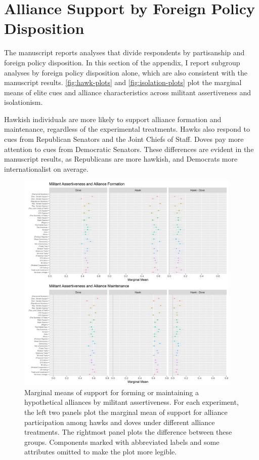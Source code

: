 \documentclass[12pt]{article}
\begin{document}
\newpage


\section{Alliance Support by Foreign Policy Disposition} 


The manuscript reports analyses that divide respondents by partisanship and foreign policy disposition. 
In this section of the appendix, I report subgroup analyses by foreign policy disposition alone, which are also consistent with the manuscript results.
\autoref{fig:hawk-plots} and \autoref{fig:isolation-plots} plot the marginal means of elite cues and alliance characteristics across militant assertiveness and isolationism. 


Hawkish individuals are more likely to support alliance formation and maintenance, regardless of the experimental treatments. 
Hawks also respond to cues from Republican Senators and the Joint Chiefs of Staff. 
Doves pay more attention to cues from Democratic Senators.
These differences are evident in the manuscript results, as Republicans are more hawkish, and Democrats more internationalist on average. 


\begin{figure}
	\centering
		\includegraphics[width=0.95\textwidth]{hawk-plots.png}
	\caption{Marginal means of support for forming or maintaining a hypothetical alliances by militant assertiveness. For each experiment, the left two panels plot the marginal mean of support for alliance participation among hawks and doves under different alliance treatments. The rightmost panel plots the difference between these groups. Components marked with abbreviated labels and some attributes omitted to make the plot more legible.}
	\label{fig:hawk-plots}
\end{figure}
\end{document}
